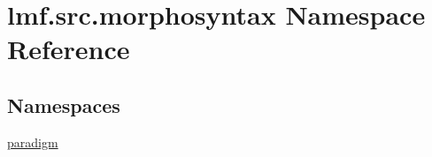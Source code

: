 \hypertarget{namespacelmf_1_1src_1_1morphosyntax}{\section{lmf.\+src.\+morphosyntax Namespace Reference}
\label{namespacelmf_1_1src_1_1morphosyntax}
}
\subsection*{Namespaces}
\begin{DoxyCompactItemize}
\item 
 \hyperlink{namespacelmf_1_1src_1_1morphosyntax_1_1paradigm}{paradigm}
\end{DoxyCompactItemize}
